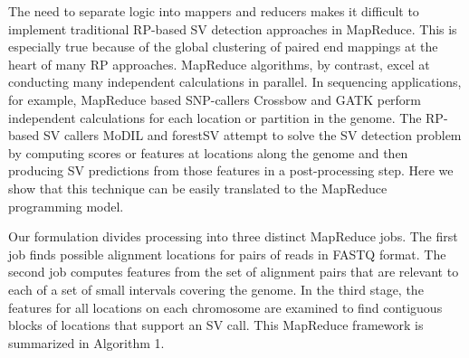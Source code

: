 \documentclass[11pt]{article}
\begin{document}
The need to separate logic into mappers and reducers makes it difficult to implement traditional RP-based SV detection approaches in MapReduce. This is especially true because of the global clustering of paired end mappings at the heart of many RP approaches. MapReduce algorithms, by contrast, excel at conducting many independent calculations in parallel. In sequencing applications, for example, MapReduce based SNP-callers Crossbow \autocite{Langmead:2009p1225} and GATK \autocite{McKenna:2010p1051} perform independent calculations for each location or partition in the genome. The RP-based SV callers MoDIL \autocite{Lee:2009da} and forestSV \autocite{Michaelson:2012fj} attempt to solve the SV detection problem by computing scores or features at locations along the genome and then producing SV predictions from those features in a post-processing step. Here we show that this technique can be easily translated to the MapReduce programming model.

Our formulation divides processing into three distinct MapReduce jobs. The first job finds possible alignment locations for pairs of reads in FASTQ format. The second job computes features from the set of alignment pairs that are relevant to each of a set of small intervals covering the genome. In the third stage, the features for all locations on each chromosome are examined to find contiguous blocks of locations that support an SV call. This MapReduce framework is summarized in Algorithm 1.
\end{document}
